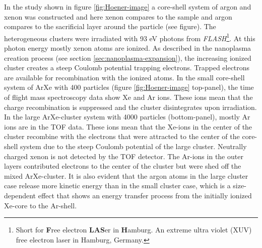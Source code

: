 In the study shown in figure \ref{fig:Hoener-image} a core-shell system of argon and xenon was constructed and here xenon compares to the sample and argon compares to the sacrificial layer around the particle (see figure). The heterogeneous clusters were irradiated with 93 eV photons from \textit{FLASH}\footnote{Short for \textbf{F}ree electron \textbf{LAS}er in \textbf{H}amburg. An extreme ultra violet (XUV) free electron laser in Hamburg, Germany.}. At this photon energy mostly xenon atoms are ionized. As described in the nanoplasma creation process (see section \ref{sec:nanoplasma-expansion}), the increasing ionized cluster creates a steep Coulomb potential trapping electrons. Trapped electrons are available for recombination with the ionized atoms. In the small core-shell system of ArXe with 400 particles (figure \ref{fig:Hoener-image} top-panel), the time of flight mass spectroscopy data show Xe and Ar ions. These ions mean that the charge recombination is suppressed and the cluster disintegrates upon irradiation. In the large ArXe-cluster system with 4000 particles (bottom-panel), mostly Ar ions are in the TOF data. These ions mean that the Xe-ions in the center of the cluster recombine with the electrons that were attracted to the center of the core-shell system due to the steep Coulomb potential of the large cluster. Neutrally charged xenon is not detected by the TOF detector. The Ar-ions in the outer layers contributed electrons to the center of the cluster but were shed off the mixed ArXe-cluster. It is also evident that the argon atoms in the large cluster case release more kinetic energy than in the small cluster case, which is a size-dependent effect that shows an energy transfer process from the initially ionized Xe-core to the Ar-shell.
%
%
%
%